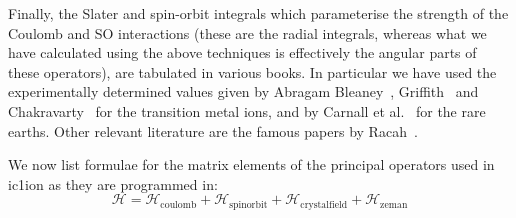 Finally, the Slater and spin-orbit integrals which parameterise the strength of the Coulomb and SO
interactions (these are the radial integrals, whereas what we have calculated using the above
techniques is effectively the angular parts of these operators), are tabulated in various books. In
particular we have used the experimentally determined values given by Abragam
Bleaney~\cite{abragam70-1}, Griffith~\cite{griffith71-1} and Chakravarty~\cite{chakravarty80-1} for
the transition metal ions, and by Carnall et al.~\cite{carnall89,carnall92} for the rare earths.
Other relevant literature are the famous papers by Racah~\cite{racah42-186,racah42-438,racah43-367}.

%
%


We now list formulae for the matrix elements of the principal operators used in {\prg ic1ion} as
they are programmed in:
\begin{equation}
 \mathcal H = \mathcal H_{\mathrm{coulomb}} + \mathcal H_{\mathrm {spinorbit}} + \mathcal H_{\mathrm{crystalfield}} + \mathcal H_{\mathrm{zeman}}
\end{equation}

